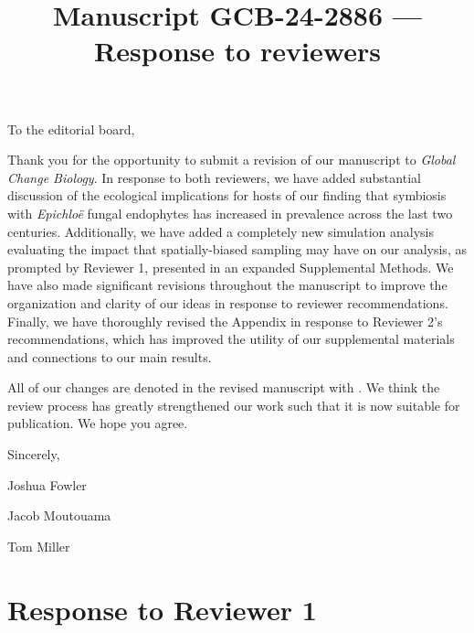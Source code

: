 \documentclass[12pt]{article}
\newcommand{\revise}[1]{{\color{Mahogany}{#1}}}
\begin{document}
\title{Manuscript GCB-24-2886 --- Response to reviewers}

\maketitle
\noindent To the editorial board,


Thank you for the opportunity to submit a revision of our manuscript to \emph{Global Change Biology}. 
In response to both reviewers, we have added substantial discussion of the ecological implications for hosts of our finding that symbiosis with \emph{Epichloë} fungal endophytes has increased in prevalence across the last two centuries.
Additionally, we have added a completely new simulation analysis evaluating the impact that spatially-biased sampling may have on our analysis, as prompted by Reviewer 1, presented in an expanded Supplemental Methods.
We have also made significant revisions throughout the manuscript to improve the organization and clarity of our ideas in response to reviewer recommendations.   
Finally, we have thoroughly revised the Appendix in response to Reviewer 2's recommendations, which has improved the utility of our supplemental materials and connections to our main results. 

All of our changes are denoted in the revised manuscript with \revise{Mahogany font}. 
We think the review process has greatly strengthened our work such that it is now suitable for publication.
We hope you agree. 

\vspace{2em}
Sincerely,

Joshua Fowler

Jacob Moutouama

Tom Miller



\newpage

\section{Response to Reviewer 1}
\vspace{-2em}
\end{document}
